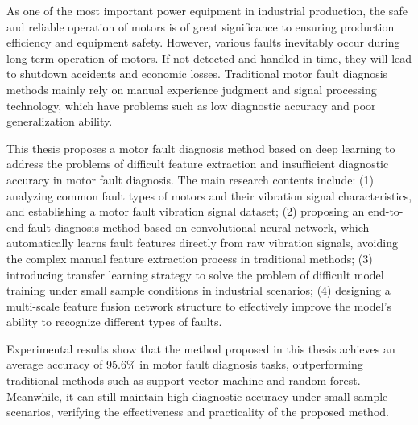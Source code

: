 \begin{enabstract}
	As one of the most important power equipment in industrial production, the safe and reliable operation of motors is of great significance to ensuring production efficiency and equipment safety. However, various faults inevitably occur during long-term operation of motors. If not detected and handled in time, they will lead to shutdown accidents and economic losses. Traditional motor fault diagnosis methods mainly rely on manual experience judgment and signal processing technology, which have problems such as low diagnostic accuracy and poor generalization ability.

	This thesis proposes a motor fault diagnosis method based on deep learning to address the problems of difficult feature extraction and insufficient diagnostic accuracy in motor fault diagnosis. The main research contents include: (1) analyzing common fault types of motors and their vibration signal characteristics, and establishing a motor fault vibration signal dataset; (2) proposing an end-to-end fault diagnosis method based on convolutional neural network, which automatically learns fault features directly from raw vibration signals, avoiding the complex manual feature extraction process in traditional methods; (3) introducing transfer learning strategy to solve the problem of difficult model training under small sample conditions in industrial scenarios; (4) designing a multi-scale feature fusion network structure to effectively improve the model's ability to recognize different types of faults.

	Experimental results show that the method proposed in this thesis achieves an average accuracy of 95.6\% in motor fault diagnosis tasks, outperforming traditional methods such as support vector machine and random forest. Meanwhile, it can still maintain high diagnostic accuracy under small sample scenarios, verifying the effectiveness and practicality of the proposed method.

\end{enabstract}